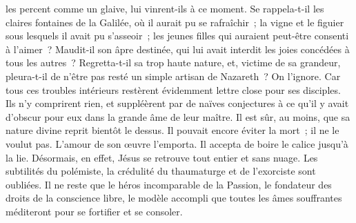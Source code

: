 \documentclass[french,twoside]{book} %
\begin{document}
les percent comme un glaive, lui vinrent-ils à ce moment. Se rappela-t-il les claires fontaines de la Galilée, où il aurait pu se rafraîchir ; la vigne et le figuier sous lesquels il avait pu s’asseoir ; les jeunes filles qui auraient peut-être consenti à l’aimer ? Maudit-il son âpre destinée, qui lui avait interdit les joies concédées à tous les autres ? Regretta-t-il sa trop haute nature, et, victime de sa grandeur, pleura-t-il de n’être pas resté un simple artisan de Nazareth ? On l’ignore. Car tous ces troubles intérieurs restèrent évidemment lettre close pour ses disciples. Ils n’y comprirent rien, et suppléèrent par de naïves conjectures à ce qu’il y avait d’obscur pour eux dans la grande âme de leur maître. Il est sûr, au moins, que sa nature divine reprit bientôt le dessus. Il pouvait encore éviter la mort ; il ne le voulut pas. L’amour de son œuvre l’emporta. Il accepta de boire le calice jusqu’à la lie. Désormais, en effet, Jésus se retrouve tout entier et sans nuage. Les subtilités du polémiste, la crédulité du thaumaturge et de l’exorciste sont oubliées. Il ne reste que le héros incomparable de la Passion, le fondateur des droits de la conscience libre, le modèle accompli que toutes les âmes souffrantes méditeront pour se fortifier et se consoler.\par
\end{document}
